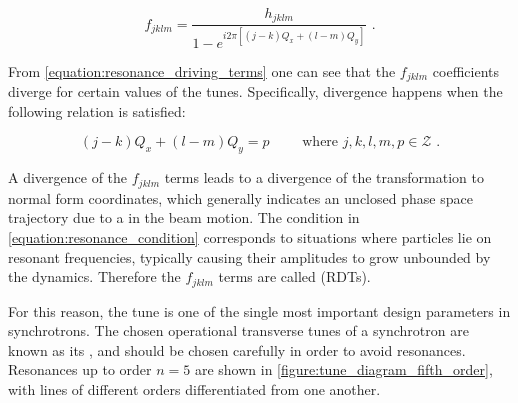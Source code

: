\begin{equation}
    f_{jklm} = \frac{h_{jklm}}{1 - e^{i 2 \pi \left[ \left(j-k\right) Q_x + \left(l-m\right) Q_y \right]}} \text{ .}
    \label{equation:resonance_driving_terms}
\end{equation}

From \cref{equation:resonance_driving_terms} one can see that the \(f_{jklm}\) coefficients diverge for certain values of the tunes.
Specifically, divergence happens when the following relation is satisfied:

\begin{equation}
    \left(j-k\right) Q_x + \left(l-m\right) Q_y = p \quad \quad \text { where } j, k, l, m, p \in \mathcal{Z} \text{ .}
    \label{equation:resonance_condition}
\end{equation}

A divergence of the \(f_{jklm}\) terms leads to a divergence of the transformation to normal form coordinates, which generally indicates an unclosed phase space trajectory due to a  in the beam motion.
The condition in \cref{equation:resonance_condition} corresponds to situations where particles lie on resonant frequencies, typically causing their amplitudes to grow unbounded by the dynamics.
Therefore the \(f_{jklm}\) terms are called  (RDTs).

For this reason, the tune is one of the single most important design parameters in synchrotrons.
The chosen operational transverse tunes of a synchrotron are known as its , and should be chosen carefully in order to avoid resonances.
Resonances up to order \(n = 5\) are shown in \cref{figure:tune_diagram_fifth_order}, with lines of different orders differentiated from one another.

